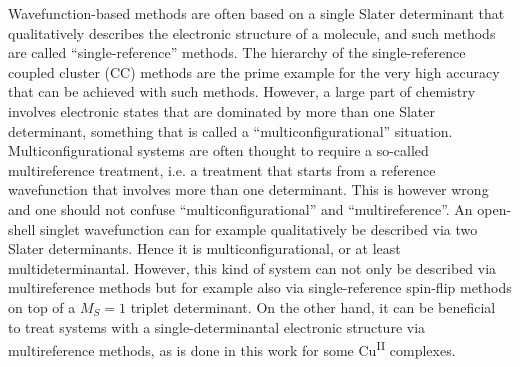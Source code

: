 Wavefunction-based methods are often based on a single Slater determinant that qualitatively describes the electronic structure of a molecule, and such methods are called ``single-reference'' methods. The hierarchy of the single-reference coupled cluster (CC) methods are the prime example for the very high accuracy that can be achieved with such methods.\cite{BartlM_2007_291}
However, a large part of chemistry involves electronic states that are dominated by more than one Slater determinant, something that is called a ``multiconfigurational'' situation. Multiconfigurational systems are often thought to require a so-called multireference treatment, i.e. a treatment that starts from a reference wavefunction that involves more than one determinant. This is however wrong and one should not confuse ``multiconfigurational'' and ``multireference''. An open-shell singlet wavefunction can for example qualitatively be described via two Slater determinants. Hence it is multiconfigurational, or at least multideterminantal. However, this kind of system can not only be described via multireference methods but for example also via single-reference spin-flip methods on top of a  $M_S=1$ triplet determinant.\cite{OrmsK_2018_13127}
On the other hand, it can be beneficial to treat systems with a single-determinantal electronic structure via multireference methods, as is done in this work for some Cu\textsuperscript{II} complexes.

